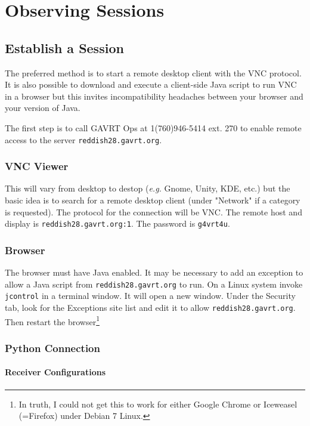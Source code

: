\documentclass[letterpaper,11pt]{report}
\begin{document}
\chapter{Observing Sessions}

\section{Establish a Session}

The preferred method is to start a remote desktop client with the VNC protocol.
It is also possible to download and execute a client-side Java script to run
VNC in a browser but this invites incompatibility headaches between your browser
and your version of Java.

The first step is to call GAVRT Ops at 1(760)946-5414 ext. 270 to enable remote
access to the server {\tt reddish28.gavrt.org}.

\subsection{VNC Viewer}

This will vary from desktop to destop ({\it e.g.} Gnome, Unity, KDE, etc.) but
the basic idea is to search for a remote desktop client (under "Network" if a
category is requested).  The protocol for the connection will be VNC.
The remote host and display is {\tt reddish28.gavrt.org:1}.  The password is
{\tt g4vrt4u}.

\subsection{Browser}

The browser must have Java enabled.  It may be necessary to add an exception to
allow a Java script from {\tt reddish28.gavrt.org} to run.  On a Linux system
invoke {\tt jcontrol} in a terminal window.  It will open a new window.  Under
the Security tab, look for the Exceptions site list and edit it to allow
{\tt reddish28.gavrt.org}.  Then restart the browser\footnote{In truth, I could
not get this to work for either Google Chrome or Iceweasel (=Firefox) under
Debian 7 Linux.}

\subsection{Python Connection}


\subsubsection{Receiver Configurations}
\end{document}
